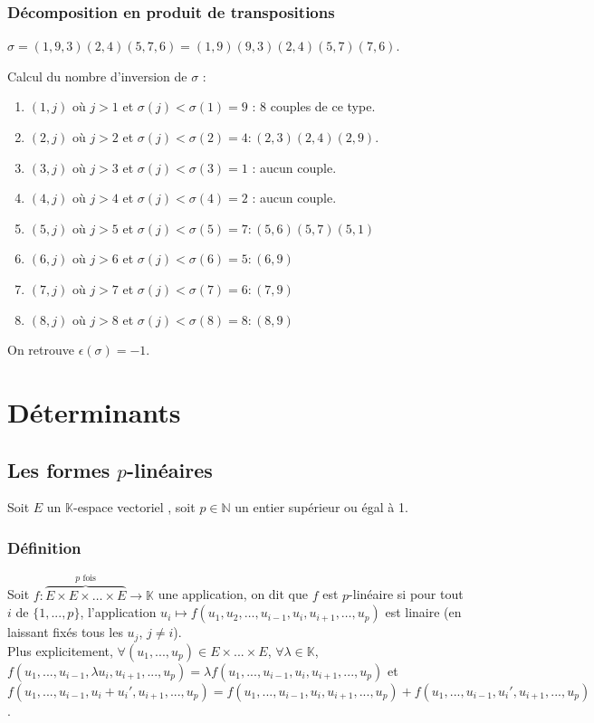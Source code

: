 \documentclass[a4paper,10pt]{book} %
\newcommand{\N}{\mathbb{N}}
\newcommand{\K}{\mathbb{K}}
\newcommand{\ev}{espace vectoriel }
\begin{document}
\subsection{Décomposition en produit de transpositions}
$\sigma=(1,9,3)(2,4)(5,7,6)=(1,9)(9,3)(2,4)(5,7)(7,6)$.

Calcul du nombre d'inversion de $\sigma$ :\\
\begin{enumerate}
\item $(1,j)$ où $j>1$ et $\sigma(j)<\sigma(1)=9$ :  8 couples de ce type.
\item $(2,j)$ où $j>2$ et $\sigma(j)<\sigma(2)=4 : (2,3)(2,4)(2,9)$.
\item $(3,j)$ où $j>3$ et $\sigma(j)<\sigma(3)=1$ : aucun couple.
\item $(4,j)$ où $j>4$ et $\sigma(j)<\sigma(4)=2$ : aucun couple.
\item $(5,j)$ où $j>5$ et $\sigma(j)<\sigma(5)=7 : (5,6)(5,7)(5,1)$
\item $(6,j)$ où $j>6$ et $\sigma(j)<\sigma(6)=5 : (6,9)$
\item $(7,j)$ où $j>7$ et $\sigma(j)<\sigma(7)=6 : (7,9)$
\item $(8,j)$ où $j>8$ et $\sigma(j)<\sigma(8)=8 : (8,9)$
\end{enumerate}

On retrouve $\epsilon(\sigma)=-1$.




\chapter{Déterminants}
\section{Les formes $p$-linéaires}
Soit $E$ un $\K$-\ev, soit $p\in \N$ un entier supérieur ou égal à 1.

\subsection{Définition}
Soit $f : \overset{p\text{ fois}}{\overbrace{E\times E\times \dots \times E}}\rightarrow \K$ une application, on dit que $f$ est $p$-linéaire si pour tout $i$ de $\{1,...,p\}$, l'application $u_i\mapsto f(u_1,u_2,\dots,u_{i-1},u_i,u_{i+1},\dots,u_p)$ est linaire (en laissant fixés tous les $u_j$, $j\neq i$).\\

Plus explicitement, $\forall (u_1,...,u_p)\in E\times ...\times E$, $\forall \lambda\in \K$,\\ $f(u_1,...,u_{i-1},\lambda u_i,u_{i+1},...,u_p)=\lambda f(u_1,...,u_{i-1},u_i,u_{i+1},...,u_p)$ et\\ $f(u_1,...,u_{i-1},u_i+u_i',u_{i+1},...,u_p)=f(u_1,...,u_{i-1},u_i,u_{i+1},...,u_p)+f(u_1,...,u_{i-1},u_i',u_{i+1},...,u_p)$.
\end{document}
